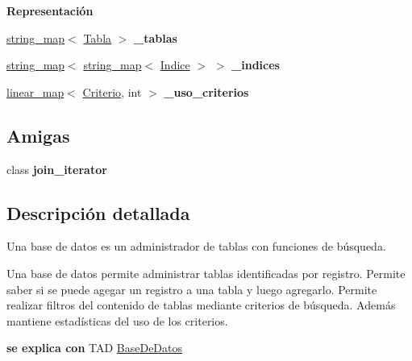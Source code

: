 \begin{Indent}{\bf Representación}
\begin{DoxyCompactItemize}
\item 
\hypertarget{classBaseDeDatos_a4dfd166b7a61aef87421b7d58db9bb05}{\hyperlink{classstring__map}{string\+\_\+map}$<$ \hyperlink{classTabla}{Tabla} $>$ {\bfseries \+\_\+tablas}}\label{classBaseDeDatos_a4dfd166b7a61aef87421b7d58db9bb05}

\item 
\hypertarget{classBaseDeDatos_aa6967041c325b137b3e785a65fee4185}{\hyperlink{classstring__map}{string\+\_\+map}$<$ \hyperlink{classstring__map}{string\+\_\+map}$<$ \hyperlink{classIndice}{Indice} $>$ $>$ {\bfseries \+\_\+indices}}\label{classBaseDeDatos_aa6967041c325b137b3e785a65fee4185}

\item 
\hypertarget{classBaseDeDatos_acc03ee648f19ad950d399861cc263a30}{\hyperlink{classlinear__map}{linear\+\_\+map}$<$ \hyperlink{classBaseDeDatos_a6742a222e87623bc92a810a693fb337b}{Criterio}, int $>$ {\bfseries \+\_\+uso\+\_\+criterios}}\label{classBaseDeDatos_acc03ee648f19ad950d399861cc263a30}

\end{DoxyCompactItemize}
\end{Indent}
\subsection*{Amigas}
\begin{DoxyCompactItemize}
\item 
\hypertarget{classBaseDeDatos_a25731a72110a07355eaf9c152dcf0cb3}{class {\bfseries join\+\_\+iterator}}\label{classBaseDeDatos_a25731a72110a07355eaf9c152dcf0cb3}

\end{DoxyCompactItemize}


\subsection{Descripción detallada}
Una base de datos es un administrador de tablas con funciones de búsqueda. 

Una base de datos permite administrar tablas identificadas por registro. Permite saber si se puede agegar un registro a una tabla y luego agregarlo. Permite realizar filtros del contenido de tablas mediante criterios de búsqueda. Además mantiene estadísticas del uso de los criterios.

{\bfseries se explica con} T\+A\+D \hyperlink{classBaseDeDatos}{Base\+De\+Datos} 

